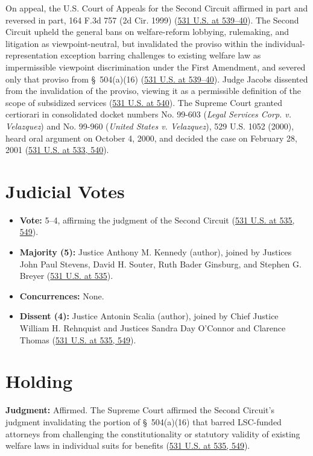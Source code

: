 \documentclass[12pt]{article}
\begin{document}
On appeal, the U.S. Court of Appeals for the Second Circuit affirmed in part and reversed in part, 164 F.3d 757 (2d Cir. 1999) (\href{https://supreme.justia.com/cases/federal/us/531/533/}{531 U.S. at 539--40}). The Second Circuit upheld the general bans on welfare-reform lobbying, rulemaking, and litigation as viewpoint-neutral, but invalidated the proviso within the individual-representation exception barring challenges to existing welfare law as impermissible viewpoint discrimination under the First Amendment, and severed only that proviso from \S~504(a)(16) (\href{https://supreme.justia.com/cases/federal/us/531/533/}{531 U.S. at 539--40}). Judge Jacobs dissented from the invalidation of the proviso, viewing it as a permissible definition of the scope of subsidized services (\href{https://supreme.justia.com/cases/federal/us/531/533/}{531 U.S. at 540}). The Supreme Court granted certiorari in consolidated docket numbers No. 99-603 (\textit{Legal Services Corp. v. Velazquez}) and No. 99-960 (\textit{United States v. Velazquez}), 529 U.S. 1052 (2000), heard oral argument on October 4, 2000, and decided the case on February 28, 2001 (\href{https://supreme.justia.com/cases/federal/us/531/533/}{531 U.S. at 533, 540}).

\section{Judicial Votes}
\begin{itemize}
\item \textbf{Vote:} 5--4, affirming the judgment of the Second Circuit (\href{https://supreme.justia.com/cases/federal/us/531/533/}{531 U.S. at 535, 549}).
\item \textbf{Majority (5):} Justice Anthony M. Kennedy (author), joined by Justices John Paul Stevens, David H. Souter, Ruth Bader Ginsburg, and Stephen G. Breyer (\href{https://supreme.justia.com/cases/federal/us/531/533/}{531 U.S. at 535}).
\item \textbf{Concurrences:} None.
\item \textbf{Dissent (4):} Justice Antonin Scalia (author), joined by Chief Justice William H. Rehnquist and Justices Sandra Day O'Connor and Clarence Thomas (\href{https://supreme.justia.com/cases/federal/us/531/533/}{531 U.S. at 535, 549}).
\end{itemize}

\section{Holding}
\textbf{Judgment:} Affirmed. The Supreme Court affirmed the Second Circuit's judgment invalidating the portion of \S~504(a)(16) that barred LSC-funded attorneys from challenging the constitutionality or statutory validity of existing welfare laws in individual suits for benefits (\href{https://supreme.justia.com/cases/federal/us/531/533/}{531 U.S. at 535, 549}).
\end{document}
